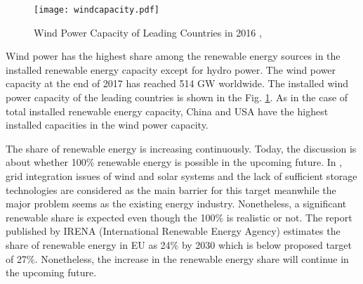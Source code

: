 \begin{figure}[h!]
	\centering
	\texttt{[image: windcapacity.pdf]}
	\caption{Wind Power Capacity of Leading Countries in 2016 \cite{InternationalRenewableEnergyAgencyIRENA2018},\cite{InternationalRenewableEnergyAgency2017}}
	\label{windcap}
\end{figure}
Wind power has the highest share among the renewable energy sources in the installed renewable energy capacity except for hydro power. The wind power capacity at the end of 2017 has reached 514 GW worldwide\cite{InternationalRenewableEnergyAgencyIRENA2018}. The installed wind power capacity of the leading countries is shown in the Fig. \ref{windcap}. As in the case of total installed renewable energy capacity, China and USA have the highest installed capacities in the wind power capacity. \par
The share of renewable energy is increasing continuously. Today, the discussion is about whether 100\% renewable energy is possible in the upcoming future. In \cite{REN212017d}, grid integration issues of wind and solar systems and the lack of sufficient storage technologies are considered as the main barrier for this target meanwhile the major problem seems as the existing energy industry. Nonetheless, a significant renewable share is expected even though the 100\% is realistic or not. The report published by IRENA (International Renewable Energy Agency) estimates the share of renewable energy in EU as 24\% by 2030 which is below proposed target of 27\%\cite{IRENA2014}. Nonetheless, the increase in the renewable energy share will continue in the upcoming future. \par
 
